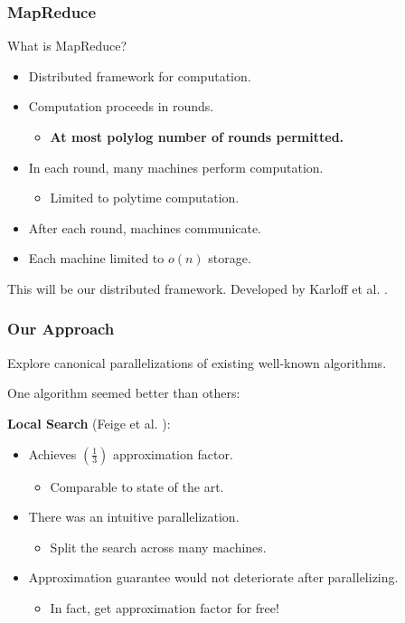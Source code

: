 \documentclass{beamer}
\begin{document}
\begin{frame}
\frametitle{MapReduce}
What is MapReduce? 
\begin{itemize}
\item Distributed framework for computation.
\item Computation proceeds in rounds.
\begin{itemize}
\item \textbf{At most polylog number of rounds permitted.}
\end{itemize}
\item In each round, many machines perform computation.
\begin{itemize}
\item Limited to polytime computation.
\end{itemize}
\item After each round, machines communicate.
\item Each machine limited to $o(n)$ storage.   
\end{itemize}
\vspace{0.4 cm}
This will be our distributed framework. Developed by Karloff et al. \cite{mapreduce}. 
\end{frame}


\begin{frame}
\frametitle{Our Approach}
Explore canonical parallelizations of existing well-known algorithms.

\vspace{0.4 cm}

One algorithm seemed better than others: 

\vspace{0.4 cm}
\textbf{Local Search} (Feige et al. \cite{Feige}): 
\begin{itemize}
\item Achieves $(\frac{1}{3})$ approximation factor. 
\begin{itemize}
\item Comparable to state of the art. 
\end{itemize}
\item There was an intuitive parallelization.
\begin{itemize}
\item Split the search across many machines.
\end{itemize}
\item Approximation guarantee would not deteriorate after parallelizing.
\begin{itemize}
\item In fact, get approximation factor for free!
\end{itemize}
\end{itemize}
\end{frame}
\end{document}
